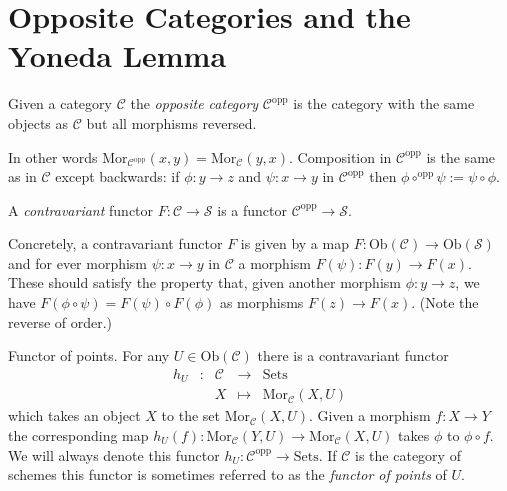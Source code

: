 \section{Opposite Categories and the Yoneda Lemma}
\label{section-opposite}

\begin{definition}
\label{definition-opposite}
Given a category $\mathcal{C}$ the {\it opposite category}
$\mathcal{C}^{\text{opp}}$ is the category with the same objects
as $\mathcal{C}$ but all morphisms reversed.
\end{definition}

\noindent
In other
words $\text{Mor}_{\mathcal{C}^{\text{opp}}}(x,y) =
\text{Mor}_{\mathcal{C}}(y,x)$. Composition in $\mathcal{C}^{\text{opp}}$
is the same as in $\mathcal{C}$ except backwards: if $\phi : y \to z$ and
$\psi : x \to y$ in $\mathcal{C}^{\text{opp}}$ then
$\phi \circ^{\text{opp}} \psi := \psi \circ \phi$.

\begin{definition}
A {\it contravariant} functor $F\colon
\mathcal{C}\to \mathcal{S}$ is a functor $\mathcal{C}^{\text{opp}}\to
\mathcal{S}$.
\end{definition}

\noindent
Concretely, a contravariant functor $F$ is given
by a map $F : \text{Ob}(\mathcal{C}) \to 
\text{Ob}(\mathcal{S})$ and for ever morphism
$\psi : x \to y$ in $\mathcal{C}$ a morphism
$F(\psi) : F(y) \to F(x)$. These should satisfy the property
that, given another morphism
$\phi : y \to z$, we have $F(\phi \circ \psi)
= F(\psi) \circ F(\phi)$ as morphisms $F(z) \to F(x)$.
(Note the reverse of order.)

\begin{example}
\label{example-hom-functor}
Functor of points.
For any $U\in \text{Ob}(\mathcal{C})$ there is a contravariant
functor 
$$
\begin{matrix}
h_U & : & \mathcal{C} 
&
\longrightarrow
&
\text{Sets} \\
&&
X
&
\longmapsto
&
\text{Mor}_{\mathcal{C}}(X,U) 
\end{matrix}
$$
which takes an object $X$ to the set
$\text{Mor}_{\mathcal{C}}(X,U)$.
Given a morphism $f\colon X\to Y$ the corresponding map
$h_U(f)\colon
\text{Mor}_{\mathcal{C}}(Y,U)\to \text{Mor}_{\mathcal{C}}(X,U)$ takes
$\phi$ to $\phi\circ f$. We will always denote
this functor $h_U : \mathcal{C}^{\text{opp}} \to \text{Sets}$.
If $\mathcal{C}$ is the category of schemes this functor is
sometimes referred to as the
\emph{functor of points} of $U$.
\end{example}

